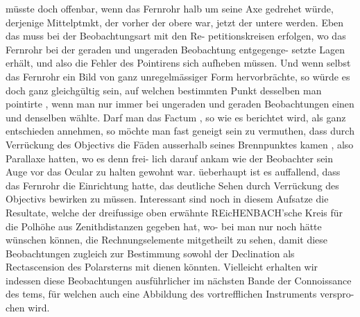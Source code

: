 \documentclass[12pt,a4paper]{article}
\begin{document}
müsste doch offenbar, wenn das Fernrohr halb um seine Axe gedrehet würde, derjenige Mittelptmkt, der\newline
vorher der obere war, jetzt der untere werden. Eben das muss bei der Beobachtungsart mit den Re-\newline
petitionskreisen erfolgen, wo das Fernrohr bei der geraden und ungeraden Beobachtung entgegenge-\newline
setzte Lagen erhält, und also die Fehler des Pointirens sich aufheben müssen. Und wenn selbst das\newline
Fernrohr ein Bild von ganz unregelmässiger Form hervorbrächte, so würde es doch ganz gleichgültig\newline
sein, auf welchen bestimmten Punkt desselben man pointirte , wenn man nur immer bei ungeraden und\newline
geraden Beobachtungen einen und denselben wählte. Darf man das Factum , so wie es berichtet wird,\newline
als ganz entschieden annehmen, so möchte man fast geneigt sein zu vermuthen, dass durch Verrückung\newline
des Objectivs die Fäden ausserhalb seines Brennpunktes kamen , also Parallaxe hatten, wo es denn frei-\newline
lich darauf ankam wie der Beobachter sein Auge vor das Ocular zu halten gewohnt war. üeberhaupt\newline
ist es auffallend, dass das Fernrohr die Einrichtung hatte, das deutliche Sehen durch Verrückung des\newline
\textbullet{}Objectivs bewirken zu müssen. Interessant sind noch in diesem Aufsatze die Resultate, welche der\newline
dreifussige oben erwähnte REicHENBACH'sche Kreis für die Polhöhe aus Zenithdistanzen gegeben hat, wo-\newline
bei man nur noch hätte wünschen können, die Rechnungselemente mitgetheilt zu sehen, damit diese\newline
Beobachtungen zugleich zur Bestimmung sowohl der Declination als Rectascension des Polarsterns mit\newline
dienen könnten. Vielleicht erhalten wir indessen diese Beobachtungen ausführlicher im nächsten Bande\newline
der Connoissance des tems, für welchen auch eine Abbildung des vortrefflichen Instruments verspro-\newline
chen wird.\newline
\end{document}
